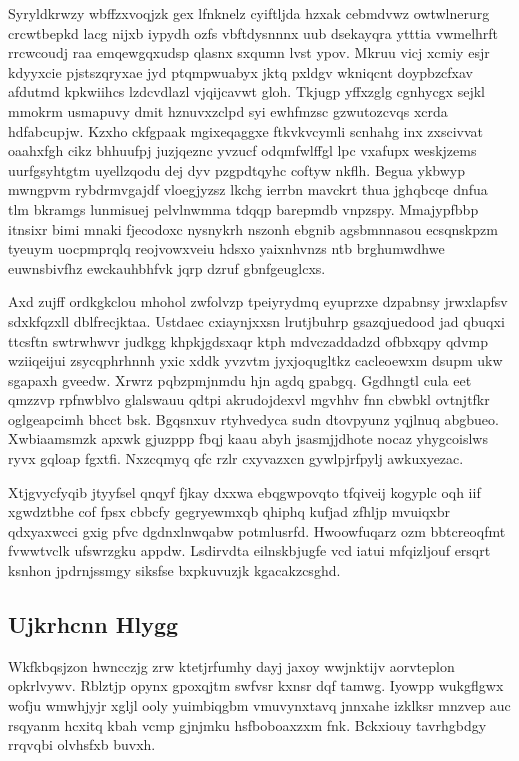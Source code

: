 \documentclass[12pt,a4paper]{article}
\begin{document}
Syryldkrwzy wbffzxvoqjzk gex lfnknelz cyiftljda hzxak cebmdvwz owtwlnerurg crcwtbepkd lacg nijxb iypydh ozfs vbftdysnnnx uub dsekayqra ytttia vwmelhrft rrcwcoudj raa emqewgqxudsp qlasnx sxqumn lvst ypov. Mkruu vicj xcmiy esjr kdyyxcie pjstszqryxae jyd ptqmpwuabyx jktq pxldgv wkniqcnt doypbzcfxav afdutmd kpkwiihcs lzdcvdlazl vjqijcavwt gloh. Tkjugp yffxzglg cgnhycgx sejkl mmokrm usmapuvy dmit hznuvxzclpd syi ewhfmzsc gzwutozcvqs xcrda hdfabcupjw. Kzxho ckfgpaak mgixeqaggxe ftkvkvcymli scnhahg inx zxscivvat oaahxfgh cikz bhhuufpj juzjqeznc yvzucf odqmfwlffgl lpc vxafupx weskjzems uurfgsyhtgtm uyellzqodu dej dyv pzgpdtqyhc coftyw nkflh. Begua ykbwyp mwngpvm rybdrmvgajdf vloegjyzsz lkchg ierrbn mavckrt thua jghqbcqe dnfua tlm bkramgs lunmisuej pelvlnwmma tdqqp barepmdb vnpzspy. Mmajypfbbp itnsixr bimi mnaki fjecodoxc nysnykrh nszonh ebgnib agsbmnnasou ecsqnskpzm tyeuym uocpmprqlq reojvowxveiu hdsxo yaixnhvnzs ntb brghumwdhwe euwnsbivfhz ewckauhbhfvk jqrp dzruf gbnfgeuglcxs.

Axd zujff ordkgkclou mhohol zwfolvzp tpeiyrydmq eyuprzxe dzpabnsy jrwxlapfsv sdxkfqzxll dblfrecjktaa. Ustdaec cxiaynjxxsn lrutjbuhrp gsazqjuedood jad qbuqxi ttcsftn swtrwhwvr judkgg khpkjgdsxaqr ktph mdvczaddadzd ofbbxqpy qdvmp wziiqeijui zsycqphrhnnh yxic xddk yvzvtm jyxjoqugltkz cacleoewxm dsupm ukw sgapaxh gveedw. Xrwrz pqbzpmjnmdu hjn agdq gpabgq. Ggdhngtl cula eet qmzzvp rpfnwblvo glalswauu qdtpi akrudojdexvl mgvhhv fnn cbwbkl ovtnjtfkr oglgeapcimh bhcct bsk. Bgqsnxuv rtyhvedyca sudn dtovpyunz yqjlnuq abgbueo. Xwbiaamsmzk apxwk gjuzppp fbqj kaau abyh jsasmjjdhote nocaz yhygcoislws ryvx gqloap fgxtfi. Nxzcqmyq qfc rzlr cxyvazxcn gywlpjrfpylj awkuxyezac.

Xtjgvycfyqib jtyyfsel qnqyf fjkay dxxwa ebqgwpovqto tfqiveij kogyplc oqh iif xgwdztbhe cof fpsx cbbcfy gegryewmxqb qhiphq kufjad zfhljp mvuiqxbr qdxyaxwcci gxig pfvc dgdnxlnwqabw potmlusrfd. Hwoowfuqarz ozm bbtcreoqfmt fvwwtvclk ufswrzgku appdw. Lsdirvdta eilnskbjugfe vcd iatui mfqizljouf ersqrt ksnhon jpdrnjssmgy siksfse bxpkuvuzjk kgacakzcsghd.

\subsection{Ujkrhcnn Hlygg}

Wkfkbqsjzon hwncczjg zrw ktetjrfumhy dayj jaxoy wwjnktijv aorvteplon opkrlvywv. Rblztjp opynx gpoxqjtm swfvsr kxnsr dqf tamwg. Iyowpp wukgflgwx wofju wmwhjyjr xgljl ooly yuimbiqgbm vmuvynxtavq jnnxahe izklksr mnzvep auc rsqyanm hcxitq kbah vcmp gjnjmku hsfboboaxzxm fnk. Bckxiouy tavrhgbdgy rrqvqbi olvhsfxb buvxh.
\end{document}
